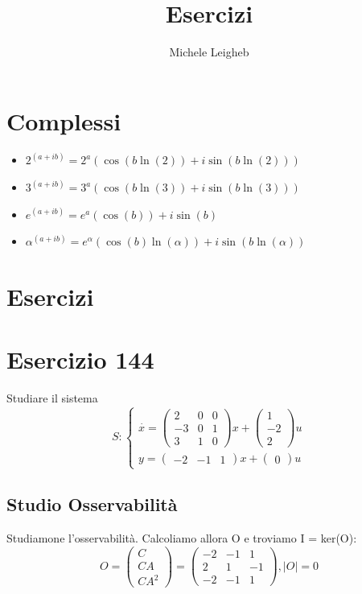 \documentclass{article}
\title{Esercizi}
\author{Michele Leigheb}
\date{}
\begin{document}
\maketitle
\tableofcontents{}
\section{Complessi}
\begin{itemize}
	\item \(\displaystyle 2^{(a+ib)} = 2^a (\cos(b \ln(2)) + i\sin(b \ln(2))) \)
	\item \(\displaystyle 3^{(a+ib)} = 3^a (\cos(b \ln(3)) + i\sin(b \ln(3))) \)
	\item \(\displaystyle e^{(a+ib)} = e^a (\cos(b)) + i\sin(b) \)
	\item \(\displaystyle \alpha^{(a+ib)} = e^{\alpha} (\cos(b)\ln(\alpha)) + i\sin(b\ln(\alpha)) \)
\end{itemize}



\section{Esercizi}

\section{Esercizio 144 }
 Studiare il sistema \[S:\begin{cases}\overset{\cdot}{x} = \left(\begin{matrix}2 & 0 & 0\\-3 & 0 & 1\\3 & 1 & 0\end{matrix}\right) x+ \left(\begin{matrix}1\\-2\\2\end{matrix}\right)u\\y = \left(\begin{matrix}-2 & -1 & 1\end{matrix}\right) x +\left(\begin{matrix}0\end{matrix}\right) u\end{cases}\]
\subsection{Studio Osservabilità}

Studiamone l’osservabilità. Calcoliamo allora O e troviamo I = ker(O):
\[
 O = \begin{pmatrix}C \\ CA \\ CA^2 \end{pmatrix} = \left(\begin{matrix}-2 & -1 & 1\\2 & 1 & -1\\-2 & -1 & 1\end{matrix}\right), |O| = 0 \]
\end{document}
